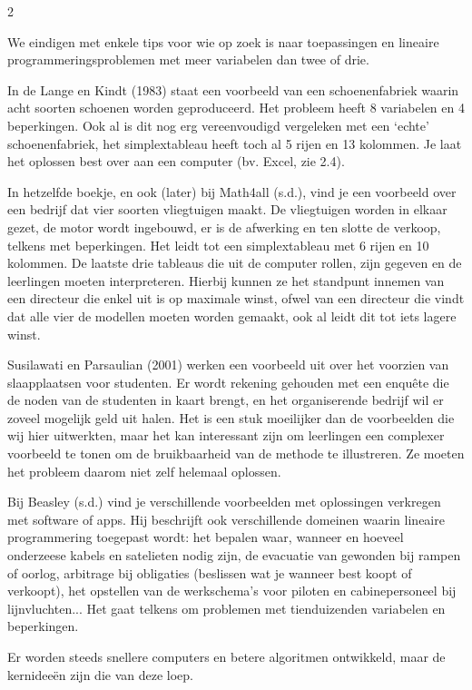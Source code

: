 \begin{multicols}{2}

    We eindigen met enkele tips voor wie op zoek is naar toepassingen en lineaire programmeringsproblemen met meer variabelen dan twee of drie.

    In de Lange en Kindt (1983) staat een voorbeeld van een schoenenfabriek waarin acht soorten schoenen worden geproduceerd. Het probleem heeft 8 variabelen en 4 beperkingen. Ook al is dit nog erg vereenvoudigd vergeleken met een `echte' schoenenfabriek, het simplextableau heeft toch al 5 rijen en 13 kolommen. Je laat het oplossen best over aan een computer (bv. Excel, zie 2.4). 

    In hetzelfde boekje, en ook (later) bij Math4all (s.d.), vind je een voorbeeld over een bedrijf dat vier soorten vliegtuigen maakt. De vliegtuigen worden in elkaar gezet, de motor wordt ingebouwd, er is de afwerking en ten slotte de verkoop, telkens met beperkingen. Het leidt tot een simplextableau met 6 rijen en 10 kolommen. De laatste drie tableaus die uit de computer rollen, zijn gegeven en de leerlingen moeten interpreteren. Hierbij kunnen ze het standpunt innemen van een directeur die enkel uit is op maximale winst, ofwel van een directeur die vindt dat alle vier de modellen moeten worden gemaakt, ook al leidt dit tot iets lagere winst.

    Susilawati en Parsaulian (2001) werken een voorbeeld uit over het voorzien van slaapplaatsen voor studenten. Er wordt rekening gehouden met een enquête die de noden van de studenten in kaart brengt, en het organiserende bedrijf wil er zoveel mogelijk geld uit halen. Het is een stuk moeilijker dan de voorbeelden die wij hier uitwerkten, maar het kan interessant zijn om leerlingen een complexer voorbeeld te tonen om de bruikbaarheid van de methode te illustreren. Ze moeten het probleem daarom niet zelf helemaal oplossen.

    Bij Beasley (s.d.) vind je verschillende voorbeelden met oplossingen verkregen met software of apps. Hij beschrijft ook verschillende domeinen waarin lineaire programmering toegepast wordt: het bepalen waar, wanneer en hoeveel onderzeese kabels en satelieten nodig zijn, de evacuatie van gewonden bij rampen of oorlog, arbitrage bij obligaties (beslissen wat je wanneer best koopt of verkoopt), het opstellen van de werkschema's voor piloten en cabinepersoneel bij lijnvluchten... Het gaat telkens om problemen met tienduizenden variabelen en beperkingen.

    Er worden steeds snellere computers en betere algoritmen ontwikkeld, maar de kernideeën zijn die van deze loep.

\end{multicols}

